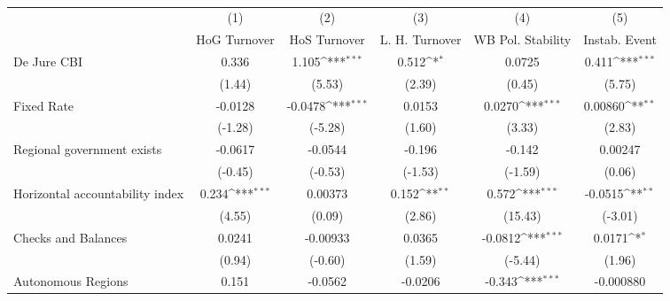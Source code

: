 \begin{table}[htbp]\centering
\def\sym#1{\ifmmode^{#1}\else\(^{#1}\)\fi}
\caption{\label{nccmultIndOLSDJ}}
\begin{tabular}{l*{5}{c}}
\toprule
                                        &\multicolumn{1}{c}{(1)}&\multicolumn{1}{c}{(2)}&\multicolumn{1}{c}{(3)}&\multicolumn{1}{c}{(4)}&\multicolumn{1}{c}{(5)}\\
                                        &\multicolumn{1}{c}{HoG Turnover}&\multicolumn{1}{c}{HoS Turnover}&\multicolumn{1}{c}{L. H. Turnover}&\multicolumn{1}{c}{WB Pol. Stability}&\multicolumn{1}{c}{Instab. Event}\\
\midrule
De Jure CBI                             &    0.336         &    1.105\sym{***}&    0.512\sym{*}  &   0.0725         &    0.411\sym{***}\\
                                        &   (1.44)         &   (5.53)         &   (2.39)         &   (0.45)         &   (5.75)         \\
\addlinespace
Fixed Rate                              &  -0.0128         &  -0.0478\sym{***}&   0.0153         &   0.0270\sym{***}&  0.00860\sym{**} \\
                                        &  (-1.28)         &  (-5.28)         &   (1.60)         &   (3.33)         &   (2.83)         \\
\addlinespace
Regional government exists              &  -0.0617         &  -0.0544         &   -0.196         &   -0.142         &  0.00247         \\
                                        &  (-0.45)         &  (-0.53)         &  (-1.53)         &  (-1.59)         &   (0.06)         \\
\addlinespace
Horizontal accountability index         &    0.234\sym{***}&  0.00373         &    0.152\sym{**} &    0.572\sym{***}&  -0.0515\sym{**} \\
                                        &   (4.55)         &   (0.09)         &   (2.86)         &  (15.43)         &  (-3.01)         \\
\addlinespace
Checks and Balances                     &   0.0241         & -0.00933         &   0.0365         &  -0.0812\sym{***}&   0.0171\sym{*}  \\
                                        &   (0.94)         &  (-0.60)         &   (1.59)         &  (-5.44)         &   (1.96)         \\
\addlinespace
Autonomous Regions                      &    0.151         &  -0.0562         &  -0.0206         &   -0.343\sym{***}&-0.000880         \\

\end{tabular}
\end{table}

